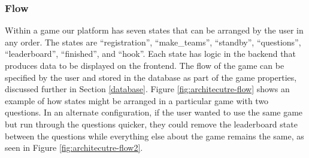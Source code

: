 \documentclass{article}
\begin{document}
        \subsubsection{Flow}\label{flow}
	        Within a game our platform has seven states that can be arranged by the user in any order. The states are ``registration'', ``make\_teams'', ``standby'', ``questions'', ``leaderboard'', ``finished'', and ``hook''. Each state has logic in the backend that produces data to be displayed on the frontend. The flow of the game can be specified by the user and stored in the database as part of the game properties, discussed further in Section \ref{database}. Figure \ref{fig:architecutre-flow} shows an example of how states might be arranged in a particular game with two questions. In an alternate configuration, if the user wanted to use the same game but run through the questions quicker, they could remove the leaderboard state between the questions while everything else about the game remains the same, as seen in Figure \ref{fig:architecutre-flow2}.
\end{document}
